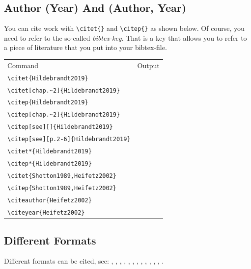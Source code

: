 \documentclass[12pt,final,a4paper,oneside]{book}
\begin{document}
\subsection{Author (Year) And (Author, Year)}
You can cite work with \verb|\citet{}| and \verb|\citep{}| as shown below. Of course, you need to refer to the so-called \textit{bibtex-key}. That is a key that allows you to refer to a piece of literature that you put into your bibtex-file. 

{\footnotesize
\begin{tabular}{ll}
Command & Output \\
\verb|\citet{Hildebrandt2019}| & \citet{Hildebrandt2019} \\
\verb|\citet[chap.~2]{Hildebrandt2019}| & \citet[chap.~2]{Hildebrandt2019} \\
\verb|\citep{Hildebrandt2019}| & \citep{Hildebrandt2019} \\
\verb|\citep[chap.~2]{Hildebrandt2019}| & \citep[chap.~2]{Hildebrandt2019} \\
\verb|\citep[see][]{Hildebrandt2019}| & \citep[see][]{Hildebrandt2019} \\
\verb|\citep[see][p.2-6]{Hildebrandt2019}| & \citep[see][p.2-6]{Hildebrandt2019} \\
\verb|\citet*{Hildebrandt2019}| & \citet*{Hildebrandt2019} \\
\verb|\citep*{Hildebrandt2019}| & \citep*{Hildebrandt2019} \\
\verb|\citet{Shotton1989,Heifetz2002}| & \citet{Shotton1989,Heifetz2002} \\
\verb|\citep{Shotton1989,Heifetz2002}| & \citep{Shotton1989,Heifetz2002} \\
\verb|\citeauthor{Heifetz2002}| & \citeauthor{Heifetz2002} \\
\verb|\citeyear{Heifetz2002}| & \citeyear{Heifetz2002} \\
\end{tabular}
}


	
\subsection{Different Formats}
	
Different formats can be cited, see:	
\citet{unpublished},
\citet{techreport},
\citet{phdthesis},
\citet{misc},
\citet{mastersthesis},
\citet{incollection},
\citet{inbook},
\citet{conference},
\citet{booklet},
\citet{book},
\citet{article},
\citet{proceedings},
\citet{webpage}.
\end{document}
